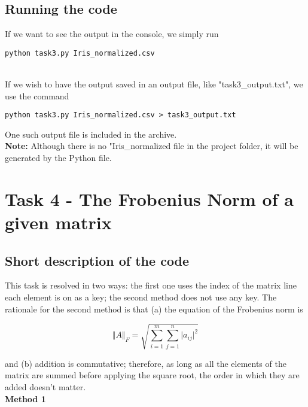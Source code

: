 \documentclass[12pt, a4paper]{article}
\begin{document}
\subsection{Running the code}
If we want to see the output in the console, we simply run \\

\centerline{\texttt{python task3.py Iris\_normalized.csv}}

\noindent\\
If we wish to have the output saved in an output file, like "task3\_output.txt", we use the command \\

\centerline{\texttt{python task3.py Iris\_normalized.csv > task3\_output.txt}}
\hfill 

\noindent
One such output file is included in the archive.\\

\noindent
\textbf{Note:} Although there is no "Iris\_normalized file in the project folder, it will be generated by the Python file.


\section{Task 4 -  The Frobenius Norm of a given matrix}

\subsection{Short description of the code}

This task is resolved in two ways: the first one uses the index of the matrix line each element is on as a key; the second method does not use any key. The rationale for the second method is that (a) the equation of the Frobenius norm is

\begin{equation}
	\Vert A \Vert_F = \sqrt{\sum_{i=1}^m\sum_{j=1}^n\vert a_{ij}\vert^2}
\end{equation}

\noindent
and (b) addition is commutative; therefore, as long as all the elements of the matrix are summed before applying the square root, the order in which they are added doesn't matter.\\

\noindent\textbf{Method 1}
\end{document}
